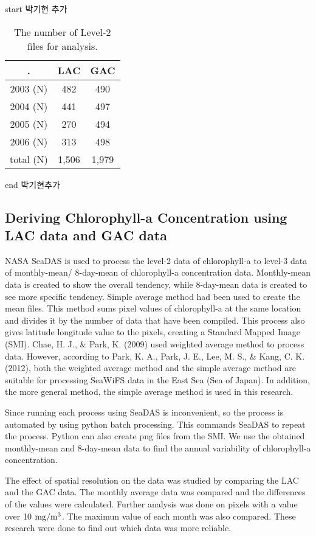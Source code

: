 start 박기현 추가
 \begin{table}[h]
	\caption{The number of Level-2 files for analysis.}
	\label{data_information}
	\centering
	\begin{tabular}{c | c | c }
		\hline \setlength{\arrayrulewidth}{3.5pt}. 
			& LAC  & GAC \\ \hline
		2003 (N) & 482 & 490 \\ \hline
		2004 (N) & 441 & 497 \\ \hline
		2005 (N) & 270 & 494 \\ \hline
		2006 (N) & 313 & 498 \\ \hline
		total (N) & 1,506 & 1,979 \\ \hline
	\end{tabular}
\end{table}
end 박기현추가

\hfill \break
\hfill \break


 \subsection{Deriving Chlorophyll-a Concentration using LAC data and GAC data}
 
NASA SeaDAS is used to process the level-2 data of chlorophyll-a to level-3 data of monthly-mean/ 8-day-mean of chlorophyll-a concentration data. Monthly-mean data is created to show the overall tendency, while 8-day-mean data is created to see more specific tendency. Simple average method had been used to create the mean files. This method sums pixel values of chlorophyll-a at the same location and divides it by the number of data that have been compiled. This process also gives latitude longitude value to the pixels, creating a Standard Mapped Image (SMI). Chae, H. J., \& Park, K. (2009) used weighted average method to process data. However, according to Park, K. A., Park, J. E., Lee, M. S., \& Kang, C. K. (2012), both the weighted average method and the simple average method are suitable for processing SeaWiFS data in the East Sea (Sea of Japan). In addition, the more general method, the simple average method is used in this research.
  
 Since running each process using SeaDAS is inconvenient, so the process is automated by using python batch processing. This commands SeaDAS to repeat the process. Python can also create png files from the SMI. We use the obtained monthly-mean and 8-day-mean data to find the annual variability of chlorophyll-a concentration.
 
 The effect of spatial resolution on the data was studied by comparing the LAC and the GAC data. The monthly average data was compared and the differences of the values were calculated. Further analysis was done on pixels with a value over 10 $\rm mg/m^3$. The maximun value of each month was also compared. These research were done to find out which data was more reliable.
 
 